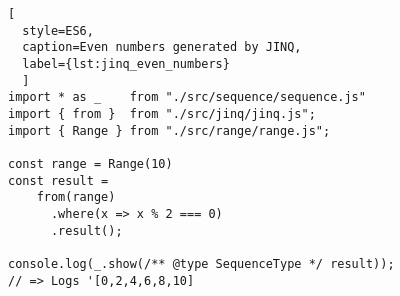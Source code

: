 \begin{lstlisting}[
  style=ES6, 
  caption=Even numbers generated by JINQ,
  label={lst:jinq_even_numbers}
  ]
import * as _    from "./src/sequence/sequence.js"
import { from }  from "./src/jinq/jinq.js";
import { Range } from "./src/range/range.js";

const range = Range(10)
const result =
    from(range)
      .where(x => x % 2 === 0)
      .result();

console.log(_.show(/** @type SequenceType */ result));
// => Logs '[0,2,4,6,8,10]
\end{lstlisting}

